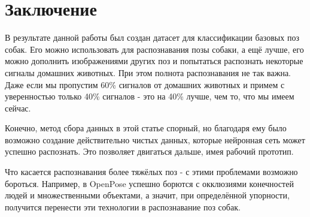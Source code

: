\chapter*{Заключение}						%


В результате данной работы был создан датасет для классификации базовых поз собак. Его можно использовать для распознавания позы собаки, а ещё лучше, его можно дополнить изображениями других поз и попытаться распознать некоторые сигналы домашних животных. При этом полнота распознавания не так важна. Даже если мы пропустим 60\% сигналов от домашних животных и примем с уверенностью только 40\% сигналов - это на 40\% лучше, чем то, что мы имеем сейчас.

Конечно, метод сбора данных в этой статье спорный, но благодаря ему было возможно создание действительно чистых данных, которые нейронная сеть может успешно распознать. Это позволяет двигаться дальше, имея рабочий прототип. 

Что касается распознавания более тяжёлых поз - с этими проблемами возможно бороться. Например, в OpenPose\cite{openpose} успешно борются с окклюзиями конечностей людей и множественными объектами, а значит, при определённой упорности, получится перенести эти технологии в распознавание поз собак.
